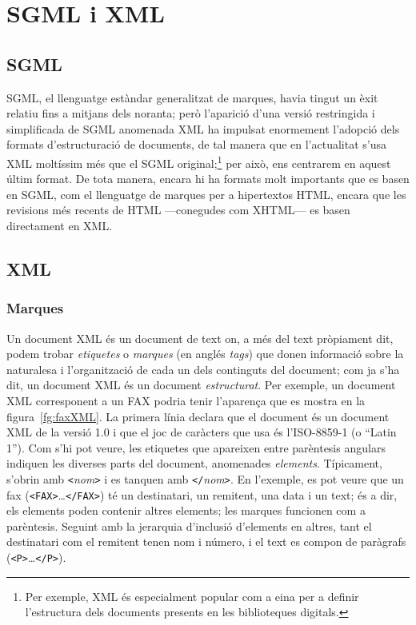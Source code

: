 \section{SGML i XML}
\label{s3:SGML}
\label{ss:SGML}

\subsection{SGML}

SGML, el llenguatge estàndar generalitzat de marques, havia tingut un
èxit relatiu fins a mitjans dels noranta; però l'aparició d'una versió
restringida i simplificada de SGML anomenada XML ha impulsat
enormement l'adopció dels formats d'estructuració de documents, de tal
manera que en l'actualitat s'usa XML moltíssim més que el SGML
original;\footnote{Per exemple, XML és especialment popular com a eina
  per a definir l'estructura dels documents presents en les
  biblioteques digitals.} per això, ens centrarem en aquest últim
format. De tota manera, encara hi ha formats molt importants que es
basen en SGML, com el llenguatge de marques per a hipertextos HTML,
  encara que les revisions més recents de HTML ---conegudes com
  XHTML--- es basen directament en XML. 

\subsection{XML}
\label{s3:XML}

\subsubsection{Marques}

Un document XML és un document de text on, a més del text pròpiament
dit, podem trobar \emph{etiquetes} o \emph{marques} (en anglés
\emph{tags}) que donen informació sobre la naturalesa i l'organització
de cada un dels continguts del document; com ja s'ha dit, un document
XML és un document \emph{estructurat}. Per exemple, un document XML
corresponent a un FAX podria tenir l'aparença que es mostra en la
figura~\ref{fg:faxXML}.  La primera línia declara que el document és
un document XML de la versió 1.0 i que el joc de caràcters que usa és
l'ISO-8859-1 (o ``Latin 1''). Com s'hi pot veure, les etiquetes que
apareixen entre parèntesis angulars indiquen les diverses parts del
document, anomenades \emph{elements}.  Típicament, s'obrin amb
\texttt{<}\emph{nom}\texttt{>} i es tanquen amb
\texttt{</}\emph{nom}\texttt{>}.  En l'exemple, es pot veure que un
fax (\texttt{<FAX>}\ldots\texttt{</FAX>}) té un destinatari, un
remitent, una data i un text; és a dir, els elements poden contenir
altres elements; les marques funcionen com a parèntesis. Seguint amb
la jerarquia d'inclusió d'elements en altres, tant el destinatari com
el remitent tenen nom i número, i el text es compon de paràgrafs
(\texttt{<P>}\ldots\texttt{</P>}).

